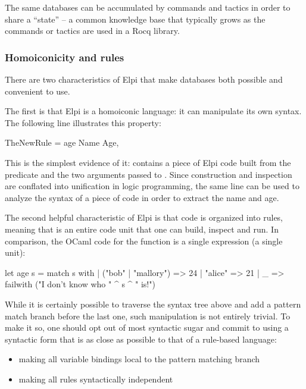 \documentclass[a4paper, 11pt]{book}
\begin{document}
The same databases can be accumulated by commands and tactics in order to
share a ``state'' -- a common knowledge base that typically grows as the commands
or tactics are used in a Rocq library.

\subsubsection{Homoiconicity and rules}


There are two characteristics of Elpi that make databases both possible and
convenient to use.


The first is that Elpi is a homoiconic language: it can manipulate its own
syntax. The following line illustrates this property:

\begin{elpicode}
TheNewRule = age Name Age,
\end{elpicode}


This is the simplest evidence of it:  contains a piece of
Elpi code built from the  predicate and the two arguments passed to
. Since construction and inspection are conflated into unification
in logic programming, the same line can be used to analyze the syntax of a
piece of code in order to extract the name and age.


The second helpful characteristic of Elpi is that code is organized into rules,
meaning that  is an entire code unit that one can build,
inspect and run. In comparison, the OCaml code for the  function is a
single expression (a single unit):

\begin{ocamlcode}
let age s =
  match s with
  | ("bob" | "mallory") => 24
  | "alice" => 21
  | _ => failwith ("I don't know who " ^ s ^ " is!")
\end{ocamlcode}


While it is certainly possible to traverse the syntax tree above and add a
pattern match branch before the last one, such manipulation is not entirely
trivial. To make it so, one should opt out of most syntactic sugar and commit
to using a syntactic form that is as close as possible to that of a rule-based
language:
\begin{itemize}
  \item making all variable bindings local to the pattern matching branch
  \item making all rules syntactically independent
\end{itemize}
\end{document}
